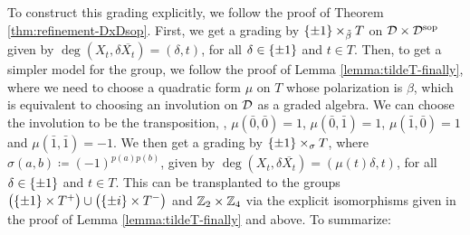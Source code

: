 To construct this grading explicitly, we follow the proof of Theorem \ref{thm:refinement-DxDsop}.
First, we get a grading by $\{ \pm 1 \} \times_{\tilde\beta} T$ on $\mathcal{D}\times \mathcal{D}^{\mathrm{sop}}$ given by $\deg (X_t, \delta \overline{X_t}) = (\delta, t)$, for all $\delta \in \{ \pm 1 \}$ and $t\in T$.
Then, to get a simpler model for the group, we follow the proof of Lemma \ref{lemma:tildeT-finally}, where we need to choose a quadratic form $\mu$ on $T$ whose polarization is $\beta$, which is equivalent to choosing an involution on $\mathcal{D}$ as a graded algebra.
We can choose the involution to be the transposition, \ie, $\mu(\bar 0, \bar 0) = 1$, $\mu(\bar 0, \bar 1) = 1$, $\mu(\bar 1, \bar 0) = 1$ and $\mu(\bar 1, \bar 1) = -1$.
We then get a grading by $\{ \pm 1 \} \times_\sigma T$, where $\sigma(a,b) \coloneqq (-1)^{p(a)p(b)}$, given by $\deg (X_t, \delta \overline{X_t}) = (\mu(t) \delta, t)$, for all $\delta \in \{ \pm 1 \}$ and $t\in T$.
This can be transplanted to the groups $\big(\{ \pm 1 \} \times T^+\big) \cup \big(\{\pm i\} \times T^-\big)$ and $\mathbb{Z}_2\times \mathbb{Z}_4$ via the explicit isomorphisms given in the proof of Lemma \ref{lemma:tildeT-finally} and above.
To summarize:

